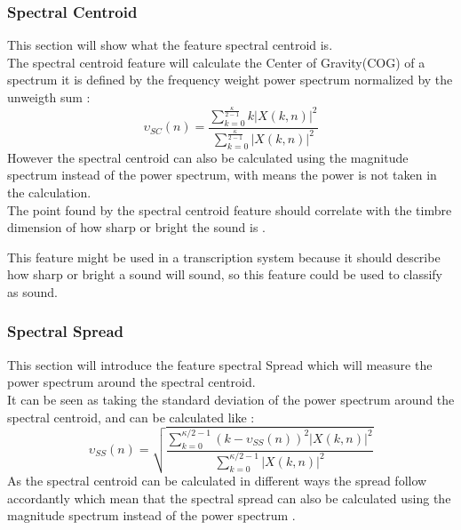 \subsubsection{Spectral Centroid}
This section will show what the feature spectral centroid is.\\
The spectral centroid feature will calculate the Center of Gravity(COG) of a spectrum it is defined by the frequency weight power spectrum normalized by the unweigth sum \citep{ACA}:
\begin{equation}\label{Spectral Centroid eq}
	\upsilon_{SC}(n) = \frac{\displaystyle\sum_{k = 0}^{\frac{\kappa}{2-1}} k\vert X(k,n) \vert^2}{\displaystyle\sum_{k = 0}^{\frac{\kappa}{2-1}} \vert X(k,n) \vert^2 }    
\end{equation} 
However the spectral centroid can also be calculated using the magnitude spectrum instead of the power spectrum, with means the power is not taken in the calculation\citep{ACA}.
\\
The point found by the spectral centroid feature should correlate with the timbre dimension of how sharp or bright the sound is \citep{ACA}. 

This feature might be used in a transcription system because it should describe how sharp or bright a sound will sound, so this feature could be used to classify as sound.

\subsubsection{Spectral Spread}
This section will introduce the feature spectral Spread which will measure the power spectrum around the spectral centroid.\\ 
It can be seen as taking the standard deviation of the power spectrum around the spectral centroid, and can be calculated like \citep{ACA}:
\begin{equation}
	\upsilon_{SS}(n)=\sqrt{\frac{\sum_{k = 0}^{\kappa/2-1}(k-\upsilon_{SS}(n))^2\vert X(k,n)\vert^2}{\sum_{k = 0}^{\kappa/2-1}\vert X(k,n)\vert^2}}
\end{equation}
As the spectral centroid can be calculated in different ways the spread follow accordantly which mean that the spectral spread can also be calculated using the magnitude spectrum instead of the power spectrum \citep{ACA}.

